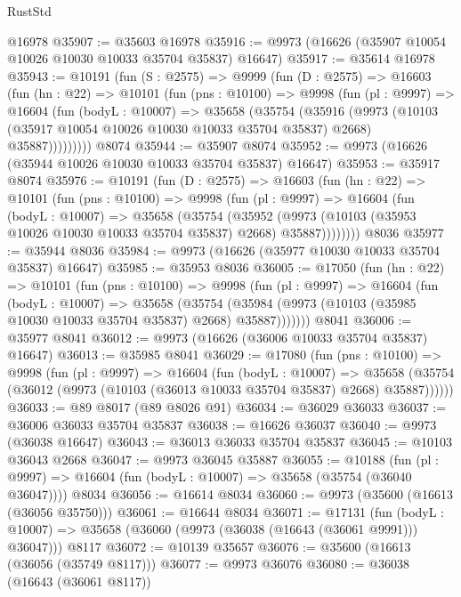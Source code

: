 \begin{lexlean}{RustStd}
\begin{coremodule}
    @16978
@35907 := @35603 @16978
@35916 := @9973 (@16626 (@35907 @10054 @10026 @10030 @10033 @35704 @35837) @16647)
@35917 := @35614 @16978
@35943 := @10191
    (fun (S : @2575) =>
    @9999
      (fun (D : @2575) =>
      @16603
        (fun (hn : @22) =>
        @10101
          (fun (pns : @10100) =>
          @9998
            (fun (pl : @9997) =>
            @16604
              (fun (bodyL : @10007) =>
              @35658
                (@35754
                  (@35916
                    (@9973
                      (@10103 (@35917 @10054 @10026 @10030 @10033 @35704 @35837) @2668)
                      @35887)))))))))
    @8074
@35944 := @35907 @8074
@35952 := @9973 (@16626 (@35944 @10026 @10030 @10033 @35704 @35837) @16647)
@35953 := @35917 @8074
@35976 := @10191
    (fun (D : @2575) =>
    @16603
      (fun (hn : @22) =>
      @10101
        (fun (pns : @10100) =>
        @9998
          (fun (pl : @9997) =>
          @16604
            (fun (bodyL : @10007) =>
            @35658
              (@35754
                (@35952
                  (@9973 (@10103 (@35953 @10026 @10030 @10033 @35704 @35837) @2668) @35887))))))))
    @8036
@35977 := @35944 @8036
@35984 := @9973 (@16626 (@35977 @10030 @10033 @35704 @35837) @16647)
@35985 := @35953 @8036
@36005 := @17050
    (fun (hn : @22) =>
    @10101
      (fun (pns : @10100) =>
      @9998
        (fun (pl : @9997) =>
        @16604
          (fun (bodyL : @10007) =>
          @35658
            (@35754 (@35984 (@9973 (@10103 (@35985 @10030 @10033 @35704 @35837) @2668) @35887)))))))
    @8041
@36006 := @35977 @8041
@36012 := @9973 (@16626 (@36006 @10033 @35704 @35837) @16647)
@36013 := @35985 @8041
@36029 := @17080
    (fun (pns : @10100) =>
    @9998
      (fun (pl : @9997) =>
      @16604
        (fun (bodyL : @10007) =>
        @35658 (@35754 (@36012 (@9973 (@10103 (@36013 @10033 @35704 @35837) @2668) @35887))))))
@36033 := @89 @8017 (@89 @8026 @91)
@36034 := @36029 @36033
@36037 := @36006 @36033 @35704 @35837
@36038 := @16626 @36037
@36040 := @9973 (@36038 @16647)
@36043 := @36013 @36033 @35704 @35837
@36045 := @10103 @36043 @2668
@36047 := @9973 @36045 @35887
@36055 := @10188
    (fun (pl : @9997) => @16604 (fun (bodyL : @10007) => @35658 (@35754 (@36040 @36047))))
    @8034
@36056 := @16614 @8034
@36060 := @9973 (@35600 (@16613 (@36056 @35750)))
@36061 := @16644 @8034
@36071 := @17131
    (fun (bodyL : @10007) => @35658 (@36060 (@9973 (@36038 (@16643 (@36061 @9991))) @36047)))
    @8117
@36072 := @10139 @35657
@36076 := @35600 (@16613 (@36056 (@35749 @8117)))
@36077 := @9973 @36076
@36080 := @36038 (@16643 (@36061 @8117))

\end{coremodule}
\end{lexlean}
